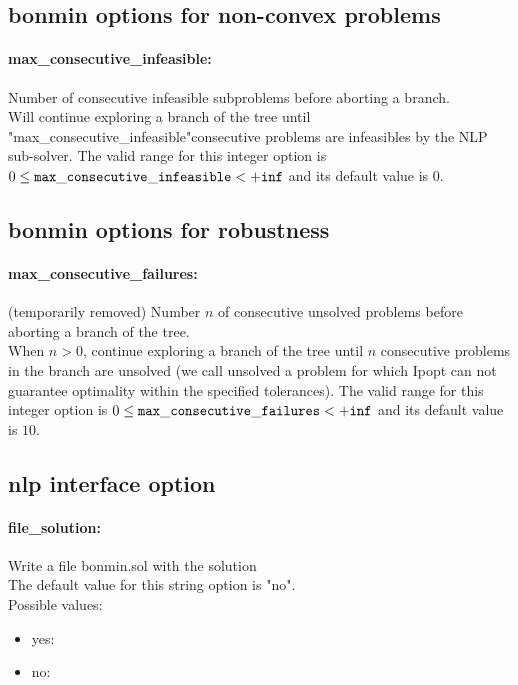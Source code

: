 \subsection{bonmin options for non-convex problems}
\label{sec:bonmin_options_for_non-convex_problems}
\paragraph{max\_consecutive\_infeasible:} Number of consecutive infeasible subproblems before aborting a branch. $\;$ \\
 Will continue exploring a branch of the tree
until "max\_consecutive\_infeasible"consecutive
problems are infeasibles by the NLP sub-solver. The valid range for this integer option is
$0 \le {\tt max\_consecutive\_infeasible } <  {\tt +inf}$
and its default value is $0$.


\subsection{bonmin options for robustness}
\label{sec:bonmin_options_for_robustness}
\paragraph{max\_consecutive\_failures:} (temporarily removed) Number $n$ of consecutive unsolved problems before aborting a branch of the tree. $\;$ \\
 When $n > 0$, continue exploring a branch of the
tree until $n$ consecutive problems in the branch
are unsolved (we call unsolved a problem for
which Ipopt can not guarantee optimality within
the specified tolerances). The valid range for this integer option is
$0 \le {\tt max\_consecutive\_failures } <  {\tt +inf}$
and its default value is $10$.


\subsection{nlp interface option}
\label{sec:nlp_interface_option}
\paragraph{file\_solution:} Write a file bonmin.sol with the solution $\;$ \\

The default value for this string option is "no".
\\ 
Possible values:
\begin{itemize}
   \item yes: 
   \item no: 
\end{itemize}


